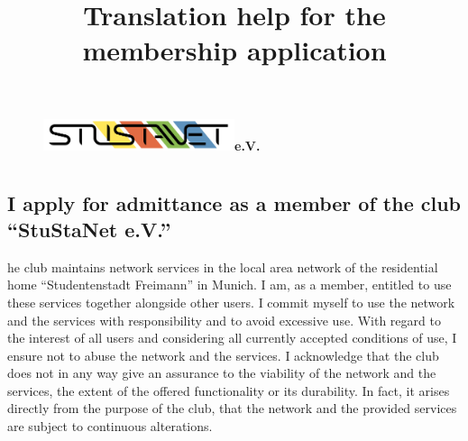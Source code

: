 \documentclass[a4paper,10pt]{scrartcl}
\title{Translation help for the membership application}
\date{}
\begin{document}

\maketitle
\vspace{-60pt}


\begin{figure}[t!]
   \centering
   \vspace{-40pt}
   \mbox{\includegraphics[width=0.50\textwidth,keepaspectratio]{StuStaNet_Logo}\Huge \sffamily \textbf{e.V.}}
   \vspace{-40pt}
\end{figure}


\section*{}

\subsection*{I apply for admittance as a member of the club \enquote{StuStaNet e.V.}}
he club maintains network services in the local area network of the residential home \enquote{Studentenstadt Freimann} in Munich. I am, as a member, entitled to use these services together alongside other users. I commit myself to use the network and the services with responsibility and to avoid excessive use. With regard to the interest of all users and considering all currently accepted conditions of use, I ensure not to abuse the network and the services. I acknowledge that the club  does not in any way give an assurance to the viability of the network and the services, the extent of the offered functionality or its durability. In fact, it arises directly from the purpose of the club, that the network and the provided services are subject to continuous alterations.
\end{document}
